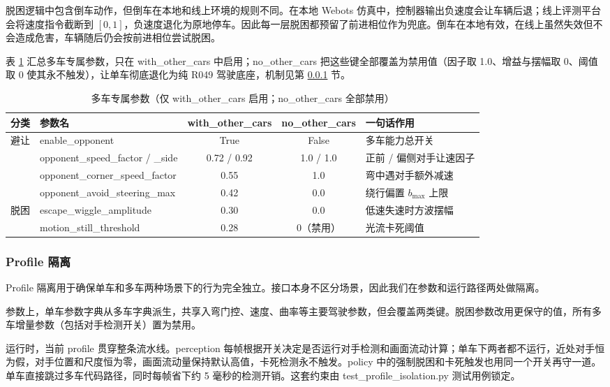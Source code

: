 \documentclass[UTF8,a4paper]{ctexart}
\begin{document}
脱困逻辑中包含倒车动作，但倒车在本地和线上环境的规则不同。在本地 Webots 仿真中，控制器输出负速度会让车辆后退；线上评测平台会将速度指令截断到 $[0,1]$，负速度退化为原地停车。因此每一层脱困都预留了前进相位作为兜底。倒车在本地有效，在线上虽然失效但不会造成危害，车辆随后仍会按前进相位尝试脱困。

表 \ref{tab:multicar_params} 汇总多车专属参数，只在 with\_other\_cars 中启用；no\_other\_cars 把这些键全部覆盖为禁用值（因子取 1.0、增益与摆幅取 0、阈值取 0 使其永不触发），让单车彻底退化为纯 R049 驾驶底座，机制见第 \ref{sec:profile} 节。

\begin{table}[!htbp]
\centering
\caption{多车专属参数（仅 with\_other\_cars 启用；no\_other\_cars 全部禁用）}
\label{tab:multicar_params}
\small
\begin{tabularx}{0.97\textwidth}{@{}lXccl@{}}
\toprule
分类 & 参数名 & with\_other\_cars & no\_other\_cars & 一句话作用 \\
\midrule
\multirow{4}{*}{避让}
 & enable\_opponent & True & False & 多车能力总开关 \\
 & opponent\_speed\_factor / \_side & 0.72 / 0.92 & 1.0 / 1.0 & 正前 / 偏侧对手让速因子 \\
 & opponent\_corner\_speed\_factor & 0.55 & 1.0 & 弯中遇对手额外减速 \\
 & opponent\_avoid\_steering\_max & 0.42 & 0.0 & 绕行偏置 $b_{\max}$ 上限 \\
\midrule
\multirow{2}{*}{脱困}
 & escape\_wiggle\_amplitude & 0.30 & 0.0 & 低速失速时方波摆幅 \\
 & motion\_still\_threshold & 0.28 & 0（禁用） & 光流卡死阈值 \\
\bottomrule
\end{tabularx}
\end{table}

\subsubsection{Profile 隔离}\label{sec:profile}

Profile 隔离用于确保单车和多车两种场景下的行为完全独立。接口本身不区分场景，因此我们在参数和运行路径两处做隔离。

参数上，单车参数字典从多车字典派生，共享入弯门控、速度、曲率等主要驾驶参数，但会覆盖两类键。脱困参数改用更保守的值，所有多车增量参数（包括对手检测开关）置为禁用。

运行时，当前 profile 贯穿整条流水线。perception 每帧根据开关决定是否运行对手检测和画面流动计算；单车下两者都不运行，近处对手恒为假，对手位置和尺度恒为零，画面流动量保持默认高值，卡死检测永不触发。policy 中的强制脱困和卡死触发也用同一个开关再守一道。单车直接跳过多车代码路径，同时每帧省下约 5 毫秒的检测开销。这套约束由 test\_profile\_isolation.py 测试用例锁定。
\end{document}
